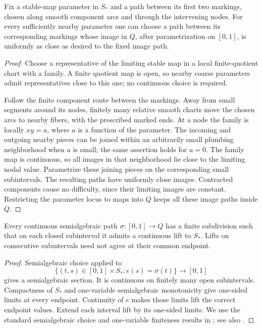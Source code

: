 \begin{lemma}\label{cross:nearby-routes}
Fix a stable-map parameter in \(S_*\) and a path between its first two
markings, chosen along smooth component arcs and through the intervening
nodes. For every sufficiently nearby parameter one can choose a path
between its corresponding markings whose image in \(Q\), after
parametrization on \([0,1]\), is uniformly as close as desired to the
fixed image path.
\end{lemma}
\begin{proof}
Choose a representative of the limiting stable map in a local
finite-quotient chart with a family. A finite quotient map is open, so
nearby coarse parameters admit representatives close to this one;
no continuous choice is required.

Follow the finite component route between the markings. Away from
small segments around its nodes, finitely many relative smooth charts
move the chosen arcs to nearby fibers, with the prescribed marked ends.
At a node the family is locally \(xy=a\), where \(a\) is a function
of the parameter. The incoming and outgoing nearby pieces can be joined
within an arbitrarily small plumbing neighborhood when \(a\) is small;
the same assertion holds for \(a=0\). The family map is continuous,
so all images in that neighborhood lie close to the limiting nodal
value. Parametrize these joining pieces on the corresponding small
subintervals. The resulting paths have uniformly close images.
Contracted components cause no difficulty, since their limiting images
are constant. Restricting the parameter locus to maps into \(Q\)
keeps all these image paths inside \(Q\).
\end{proof}

\begin{lemma}\label{cross:semialgebraic-lift}
Every continuous semialgebraic path \(\sigma:[0,1]\to Q\) has a
finite subdivision such that on each closed subinterval it admits a
continuous lift to \(S_*\). Lifts on consecutive subintervals need not
agree at their common endpoint.
\end{lemma}
\begin{proof}
Semialgebraic choice applied to
\[
 \{(t,s)\in[0,1]\times S_*:e(s)=\sigma(t)\}\longrightarrow[0,1]
\]
gives a semialgebraic section. It is continuous on finitely many open
subintervals. Compactness of \(S_*\) and one-variable semialgebraic
monotonicity give one-sided limits at every endpoint. Continuity of
\(e\) makes those limits lift the correct endpoint values. Extend each
interval lift by its one-sided limits. We use the standard semialgebraic
choice and one-variable finiteness results in
\cite[Theorems~2.1, 3.1, and 3.4]{Coste99}; see also \cite{BCR98}.
\end{proof}

